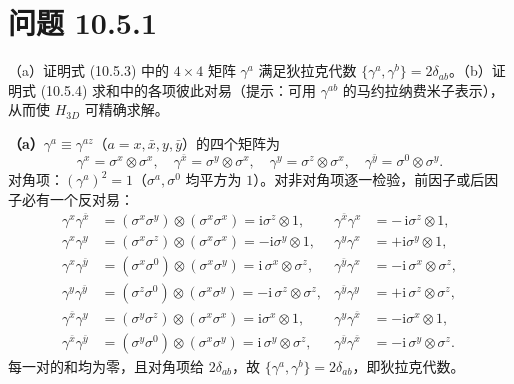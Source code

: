 \section*{问题 10.5.1}
\begin{problem}
（a）证明式 (10.5.3) 中的 $4\times4$ 矩阵 $\gamma^{a}$ 满足狄拉克代数 $\{\gamma^{a},\gamma^{b}\}=2\delta_{ab}$。（b）证明式 (10.5.4) 求和中的各项彼此对易（提示：可用 $\gamma^{ab}$ 的马约拉纳费米子表示），从而使 $H_{3D}$ 可精确求解。
\end{problem}
\solution
\textbf{（a）}$\gamma^{a}\equiv\gamma^{az}$（$a=x,\bar x,y,\bar y$）的四个矩阵为
\begin{equation*}
\gamma^{x}=\sigma^{x}\otimes\sigma^{x},\quad
\gamma^{\bar x}=\sigma^{y}\otimes\sigma^{x},\quad
\gamma^{y}=\sigma^{z}\otimes\sigma^{x},\quad
\gamma^{\bar y}=\sigma^{0}\otimes\sigma^{y}.
\end{equation*}
对角项：$(\gamma^{a})^{2}=1$（$\sigma^{a},\sigma^{0}$ 均平方为 $1$）。对非对角项逐一检验，前因子或后因子必有一个反对易：
\begin{align*}
\gamma^{x}\gamma^{\bar x}&=(\sigma^{x}\sigma^{y})\otimes(\sigma^{x}\sigma^{x})=\mathrm{i}\sigma^{z}\otimes 1,&
\gamma^{\bar x}\gamma^{x}&=-\,\mathrm{i}\sigma^{z}\otimes1,\\
\gamma^{x}\gamma^{y}&=(\sigma^{x}\sigma^{z})\otimes(\sigma^{x}\sigma^{x})=-\mathrm{i}\sigma^{y}\otimes1,&
\gamma^{y}\gamma^{x}&=+\mathrm{i}\sigma^{y}\otimes1,\\
\gamma^{x}\gamma^{\bar y}&=(\sigma^{x}\sigma^{0})\otimes(\sigma^{x}\sigma^{y})=\mathrm{i}\,\sigma^{x}\otimes\sigma^{z},&
\gamma^{\bar y}\gamma^{x}&=-\mathrm{i}\,\sigma^{x}\otimes\sigma^{z},\\
\gamma^{y}\gamma^{\bar y}&=(\sigma^{z}\sigma^{0})\otimes(\sigma^{x}\sigma^{y})=-\mathrm{i}\,\sigma^{z}\otimes\sigma^{z},&
\gamma^{\bar y}\gamma^{y}&=+\mathrm{i}\,\sigma^{z}\otimes\sigma^{z},\\
\gamma^{\bar x}\gamma^{y}&=(\sigma^{y}\sigma^{z})\otimes(\sigma^{x}\sigma^{x})=\mathrm{i}\sigma^{x}\otimes1,&
\gamma^{y}\gamma^{\bar x}&=-\mathrm{i}\sigma^{x}\otimes1,\\
\gamma^{\bar x}\gamma^{\bar y}&=(\sigma^{y}\sigma^{0})\otimes(\sigma^{x}\sigma^{y})=\mathrm{i}\,\sigma^{y}\otimes\sigma^{z},&
\gamma^{\bar y}\gamma^{\bar x}&=-\mathrm{i}\,\sigma^{y}\otimes\sigma^{z}.
\end{align*}
每一对的和均为零，且对角项给 $2\delta_{ab}$，故 $\{\gamma^{a},\gamma^{b}\}=2\delta_{ab}$，即狄拉克代数。

